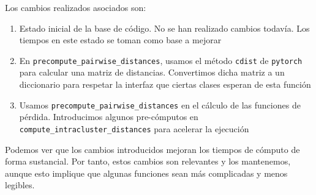 \begin{table}[H]
    \centering
    \caption{Tabla que recoge el proceso de optimización del código. Identificamos numéricamente los cambios realizados, que a continuación describiremos. Por cada cambio, vemos los nuevos resultados en los \textit{benchmarks}. También vemos el tiempo que tarda en completarse el ciclo de entrenamiento. Los tiempos de los \textit{benchmarks} se dan como un par (media, desviación típica)}
\end{table}

Los cambios realizados asociados son:

\begin{enumerate}
    \item Estado inicial de la base de código. No se han realizado cambios todavía. Los tiempos en este estado se toman como base a mejorar
    \item En \lstinline|precompute_pairwise_distances|, usamos el método \lstinline|cdist| de \lstinline|pytorch| para calcular una matriz de distancias. Convertimos dicha matriz a un diccionario para respetar la interfaz que ciertas clases esperan de esta función
    \item Usamos \lstinline|precompute_pairwise_distances| en el cálculo de las funciones de pérdida. Introducimos algunos pre-cómputos en \lstinline|compute_intracluster_distances| para acelerar la ejecución
\end{enumerate}

Podemos ver que los cambios introducidos mejoran los tiempos de cómputo de forma sustancial. Por tanto, estos cambios son relevantes y los mantenemos, aunque esto implique que algunas funciones sean más complicadas y menos legibles.

